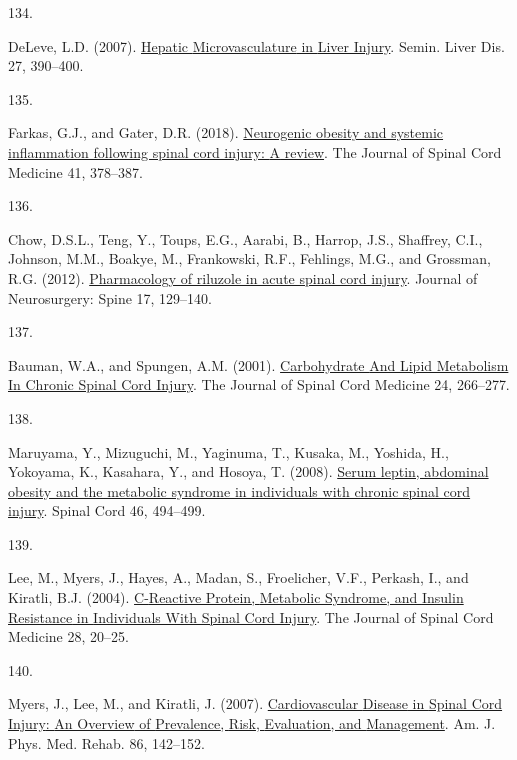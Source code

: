 \documentclass[
]{article}
\newlength{\cslhangindent}
\newlength{\csllabelwidth}
\newlength{\cslentryspacingunit} %
\newenvironment{CSLReferences}[2] %
 {%
  \setlength{\parindent}{0pt}
  \ifodd #1
  \let\oldpar\par
  \def\par{\hangindent=\cslhangindent\oldpar}
  \fi
  \setlength{\parskip}{#2\cslentryspacingunit}
 }%
 {}
\newcommand{\CSLLeftMargin}[1]{\parbox[t]{\csllabelwidth}{#1}}
\newcommand{\CSLRightInline}[1]{\parbox[t]{\linewidth - \csllabelwidth}{#1}\break}
\begin{document}
\begin{CSLReferences}{0}{0}
\leavevmode{}%
\CSLLeftMargin{134. }
\CSLRightInline{DeLeve, L.D. (2007). \href{https://doi.org/10.1055/s-2007-991515}{Hepatic {Microvasculature} in {Liver Injury}}. Semin. Liver Dis. 27, 390--400.}

\leavevmode{}%
\CSLLeftMargin{135. }
\CSLRightInline{Farkas, G.J., and Gater, D.R. (2018). \href{https://doi.org/10.1080/10790268.2017.1357104}{Neurogenic obesity and systemic inflammation following spinal cord injury: {A} review}. The Journal of Spinal Cord Medicine 41, 378--387.}

\leavevmode{}%
\CSLLeftMargin{136. }
\CSLRightInline{Chow, D.S.L., Teng, Y., Toups, E.G., Aarabi, B., Harrop, J.S., Shaffrey, C.I., Johnson, M.M., Boakye, M., Frankowski, R.F., Fehlings, M.G., and Grossman, R.G. (2012). \href{https://doi.org/10.3171/2012.5.AOSPINE12112}{Pharmacology of riluzole in acute spinal cord injury}. Journal of Neurosurgery: Spine 17, 129--140.}

\leavevmode{}%
\CSLLeftMargin{137. }
\CSLRightInline{Bauman, W.A., and Spungen, A.M. (2001). \href{https://doi.org/10.1080/10790268.2001.11753584}{Carbohydrate {And Lipid Metabolism In Chronic Spinal Cord Injury}}. The Journal of Spinal Cord Medicine 24, 266--277.}

\leavevmode{}%
\CSLLeftMargin{138. }
\CSLRightInline{Maruyama, Y., Mizuguchi, M., Yaginuma, T., Kusaka, M., Yoshida, H., Yokoyama, K., Kasahara, Y., and Hosoya, T. (2008). \href{https://doi.org/10.1038/sj.sc.3102171}{Serum leptin, abdominal obesity and the metabolic syndrome in individuals with chronic spinal cord injury}. Spinal Cord 46, 494--499.}

\leavevmode{}%
\CSLLeftMargin{139. }
\CSLRightInline{Lee, M., Myers, J., Hayes, A., Madan, S., Froelicher, V.F., Perkash, I., and Kiratli, B.J. (2004). \href{https://doi.org/10.1080/10790268.2005.11753794}{C-{Reactive Protein}, {Metabolic Syndrome}, and {Insulin Resistance} in {Individuals With Spinal Cord Injury}}. The Journal of Spinal Cord Medicine 28, 20--25.}

\leavevmode{}%
\CSLLeftMargin{140. }
\CSLRightInline{Myers, J., Lee, M., and Kiratli, J. (2007). \href{https://doi.org/10.1097/PHM.0b013e31802f0247}{Cardiovascular {Disease} in {Spinal Cord Injury}: {An Overview} of {Prevalence}, {Risk}, {Evaluation}, and {Management}}. Am. J. Phys. Med. Rehab. 86, 142--152.}


\end{CSLReferences}
\end{document}
